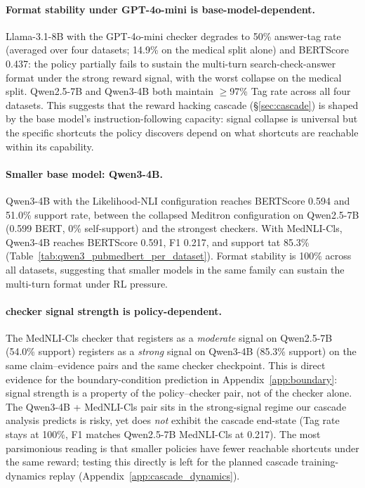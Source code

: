 \documentclass[11pt]{article}
\begin{document}
\paragraph{Format stability under GPT-4o-mini is
base-model-dependent.}
Llama-3.1-8B with the GPT-4o-mini checker degrades to
50\% answer-tag rate (averaged over four datasets;
14.9\% on the medical split alone) and BERTScore 0.437:
the policy partially fails to sustain the multi-turn
search-check-answer format under the strong reward
signal, with the worst collapse on the medical split.
Qwen2.5-7B and Qwen3-4B both maintain $\geq$97\% Tag
rate across all four datasets. This suggests that the
reward hacking cascade (\S\ref{sec:cascade}) is shaped
by the base model's instruction-following capacity:
signal collapse is universal but the specific shortcuts
the policy discovers depend on what shortcuts are
reachable within its capability.
 
\paragraph{Smaller base model: Qwen3-4B.}
Qwen3-4B with the Likelihood-NLI configuration
reaches BERTScore 0.594 and 51.0\% support rate, between
the collapsed Meditron configuration on Qwen2.5-7B
(0.599 BERT, 0\% self-support) and the strongest
checkers.
With MedNLI-Cls, Qwen3-4B reaches BERTScore 0.591,
F1 0.217, and support tat 85.3\%
(Table~\ref{tab:qwen3_pubmedbert_per_dataset}).
Format stability is 100\% across all datasets,
suggesting that smaller models in the same family can
sustain the multi-turn format under RL pressure.

\paragraph{checker signal strength is policy-dependent.}
The MedNLI-Cls checker that registers as a
\emph{moderate} signal on Qwen2.5-7B (54.0\% support)
registers as a \emph{strong} signal on Qwen3-4B
(85.3\% support) on the same claim--evidence pairs and
the same checker checkpoint.
This is direct evidence for the boundary-condition
prediction in Appendix~\ref{app:boundary}: signal strength is
a property of the policy--checker pair, not of the
checker alone.
The Qwen3-4B + MedNLI-Cls pair sits in the
strong-signal regime our cascade analysis predicts is
risky, yet does \emph{not} exhibit the cascade
end-state (Tag rate stays at 100\%, F1 matches
Qwen2.5-7B MedNLI-Cls at 0.217).
The most parsimonious reading is that smaller policies
have fewer reachable shortcuts under the same reward;
testing this directly is left for the planned cascade
training-dynamics replay
(Appendix~\ref{app:cascade_dynamics}).
\end{document}
